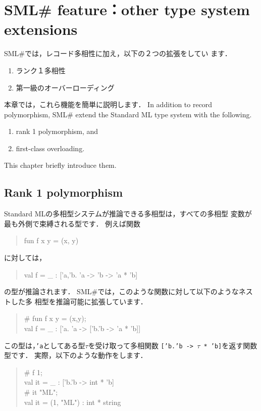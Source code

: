 \documentclass{jbook}
\newcommand{\txt}[2]{#2}
\newcommand{\smlsharp}{SML\#}
\newenvironment{program}{\begin{quote}\begin{tt}}%
                        {\end{tt}\end{quote}}
\begin{document}
\chapter{
\txt{\smlsharp{}の拡張機能：その他の型の拡張}
    {\smlsharp{} feature：other type system extensions}}
\label{chap:tutorialOthertyping}

\ifjp%
	\smlsharp{}では，レコード多相性に加え，以下の２つの拡張をしてい
ます．
\begin{enumerate}
\item ランク１多相性
\item 第一級のオーバーローディング
\end{enumerate}
	本章では，これら機能を簡単に説明します．
\else%
	In addition to record polymorphism, \smlsharp{} extend the Standard
ML type system  with the following.
\begin{enumerate}
\item rank 1 polymorphism, and
\item first-class overloading.
\end{enumerate}
	This chapter briefly introduce them.
\fi%

\section{\txt{ランク１多相性}{Rank 1 polymorphism}}
\label{sec:extensionRank1}

\ifjp%
	Standard MLの多相型システムが推論できる多相型は，すべての多相型
変数が最も外側で束縛される型です．
	例えば関数
\begin{program}
fun f x y = (x, y)
\end{program}
に対しては，
\begin{program}
val f = \_ : ['a,'b. 'a -> 'b -> 'a * 'b]
\end{program}
の型が推論されます．
	\smlsharp{}では，このような関数に対して以下のようなネストした多
相型を推論可能に拡張しています．
\begin{program}
\# fun f x y = (x,y);\\
val f = \_ : ['a. 'a -> ['b.'b -> 'a * 'b]]
\end{program}
	この型は，{\tt 'a}としてある型$\tau$を受け取って多相関数
{\tt ['b.'b -> $\tau$ * 'b]}を返す関数型です．
	実際，以下のような動作をします．
\begin{program}
\# f 1;\\
val it = \_ : ['b.'b -> int * 'b]\\
\# it "ML";\\
val it = (1, "ML") : int * string
\end{program}
\end{document}
